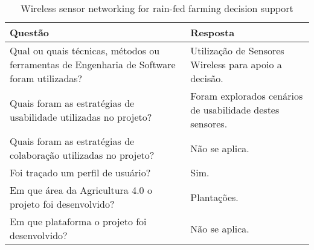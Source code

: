 \documentclass[12pt]{article}
\begin{document}
\begin{table}[!htb]
	\footnotesize
  \centering
	\begin{tabular}{|p{8cm}|p{6cm}|}
		\hline
		\textbf{Questão}                                                                           & \textbf{Resposta}                                                      \\ \hline
		Qual ou quais técnicas, métodos ou ferramentas de Engenharia de Software foram utilizadas? & Utilização de Sensores Wireless para apoio a decisão. \\ \hline
		Quais foram as estratégias de usabilidade utilizadas no projeto?                           & Foram explorados cenários de usabilidade destes sensores.                                 \\ \hline
		Quais foram as estratégias de colaboração utilizadas no projeto?                           & Não se aplica.                                 \\ \hline
		Foi traçado um perfil de usuário?                                                          & Sim.                                                                \\ \hline
		Em que área da Agricultura 4.0 o projeto foi desenvolvido?                                 & Plantações.                                    \\ \hline
		Em que plataforma o projeto foi desenvolvido?                                              & Não se aplica.                                 \\ \hline
		\end{tabular}
  \caption{Wireless sensor networking for rain-fed farming decision support}
  \label{tab:extracao4}
\end{table}
\end{document}
